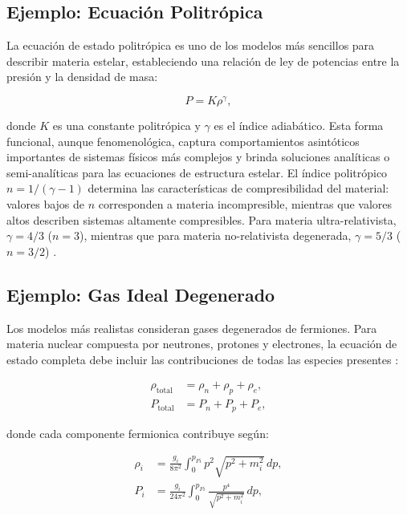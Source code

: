 \subsection{Ejemplo: Ecuación Politrópica}

La ecuación de estado politrópica es uno de los modelos más sencillos para describir materia estelar, estableciendo una relación de ley de potencias entre la presión y la densidad de masa:

\begin{equation}
	P = K \rho^{\gamma},
	\label{eq:eos_politropica}
\end{equation}

donde $K$ es una constante politrópica y $\gamma$ es el índice adiabático. Esta forma funcional, aunque fenomenológica, captura comportamientos asintóticos importantes de sistemas físicos más complejos y brinda soluciones analíticas o semi-analíticas para las ecuaciones de estructura estelar. El índice politrópico $n = 1/(\gamma - 1)$ determina las características de compresibilidad del material: valores bajos de $n$ corresponden a materia incompresible, mientras que valores altos describen sistemas altamente compresibles. Para materia ultra-relativista, $\gamma = 4/3$ ($n = 3$), mientras que para materia no-relativista degenerada, $\gamma = 5/3$ ($n = 3/2$) \cite{chandrasekharIntroductionStudyStellar1970}.

\subsection{Ejemplo: Gas Ideal Degenerado}
\label{sec:gasnpe}

Los modelos más realistas consideran gases degenerados de fermiones. Para materia nuclear compuesta por neutrones, protones y electrones, la ecuación de estado completa debe incluir las contribuciones de todas las especies presentes \cite{shapiroBlackHolesWhite2008}:

\begin{align}
	\rho_{\text{total}} &= \rho_n + \rho_p + \rho_e, \label{eq:densidad_total} \\
	P_{\text{total}} &= P_n + P_p + P_e, \label{eq:presion_total}
\end{align}

donde cada componente fermionica contribuye según:

\begin{align}
	\rho_i &= \frac{g_i}{8\pi^2} \int_0^{p_{Fi}} p^2\sqrt{p^2 + m_i^2} \, dp, \label{eq:densidad_fermi_general} \\
	P_i &= \frac{g_i}{24\pi^2} \int_0^{p_{Fi}} \frac{p^4}{\sqrt{p^2 + m_i^2}} \, dp, \label{eq:presion_fermi_general}
\end{align}

